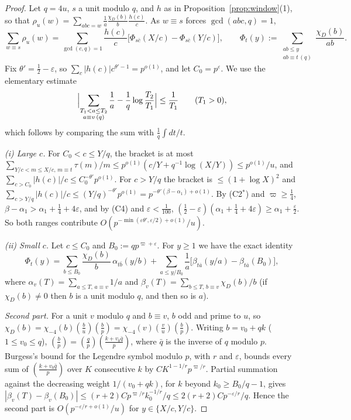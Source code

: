 \documentclass[11pt,reqno]{amsart}
\theoremstyle{definition}
\newcommand{\eps}{\varepsilon}
\newcommand{\leg}[2]{\left(\frac{#1}{#2}\right)}
\begin{document}
\begin{proof}
Let $q=4u$, $s$ a unit modulo $q$, and $h$ as in
Proposition~\ref{prop:window}(1), so that $\rho_u(w)=\sum_{abc=w}\frac1a
\frac{\chi_D(b)}b\frac{h(c)}c$.  As $w\equiv s$ forces $\gcd(abc,q)=1$,
\[
 \sum_{w\equiv s}\rho_u(w)=\sum_{\gcd(c,q)=1}\frac{h(c)}c\bigl[\Phi_{s\bar
 c}(X/c)-\Phi_{s\bar c}(Y/c)\bigr],\qquad
 \Phi_t(y):=\sum_{\substack{ab\le y\\ ab\equiv t\,(q)}}\frac{\chi_D(b)}{ab}.
\]
Fix $\theta'=\frac12-\eps$, so $\sum_c|h(c)|c^{\theta'-1}=p^{o(1)}$, and let
$C_0=p^\eps$.  We use the elementary estimate
\begin{equation}\label{eq:APharm}
 \Bigl|\sum_{\substack{T_1<a\le T_2\\ a\equiv v\,(q)}}\frac1a-\frac1q\log\frac{T_2}{T_1}\Bigr|\le\frac1{T_1}\qquad(T_1>0),
\end{equation}
which follows by comparing the sum with $\frac1q\int dt/t$.

\emph{(i) Large $c$.}  For $C_0<c\le Y/q$, the bracket is at most
$\sum_{Y/c<m\le X/c,\,m\equiv t}\tau(m)/m\le p^{o(1)}(c/Y+q^{-1}\log(X/Y))
\le p^{o(1)}/u$, and $\sum_{c>C_0}|h(c)|/c\le C_0^{-\theta'}p^{o(1)}$.
For $c>Y/q$ the bracket is $\le(1+\log X)^2$ and $\sum_{c>Y/q}|h(c)|/c\le
(Y/q)^{-\theta'}p^{o(1)}=p^{-\theta'(\beta-\alpha_1)+o(1)}$.  By (C2$^*$)
and $\varpi\ge\frac14$, $\beta-\alpha_1>\alpha_1+\frac14+4\eps$, and by (C4)
and $\eps<\frac1{100}$, $(\frac12-\eps)(\alpha_1+\frac14+4\eps)\ge\alpha_1+\frac\eps2$.
So both ranges contribute $O(p^{-\min(\eps\theta',\eps/2)+o(1)}/u)$.

\emph{(ii) Small $c$.}  Let $c\le C_0$ and $B_0:=qp^{\varpi+\eps}$.  For
$y\ge1$ we have the exact identity
\[
 \Phi_t(y)=\sum_{b\le B_0}\frac{\chi_D(b)}b\,\alpha_{t\bar b}(y/b)
 +\sum_{a\le y/B_0}\frac1a\bigl[\beta_{t\bar a}(y/a)-\beta_{t\bar a}(B_0)\bigr],
\]
where $\alpha_v(T)=\sum_{a\le T,\,a\equiv v}1/a$ and
$\beta_v(T)=\sum_{b\le T,\,b\equiv v}\chi_D(b)/b$ (if $\chi_D(b)\ne0$ then
$b$ is a unit modulo $q$, and then so is $a$).

\emph{Second part.}  For a unit $v$ modulo $q$ and $b\equiv v$, $b$ odd and
prime to $u$, so $\chi_D(b)=\chi_{-4}(b)\leg bu\leg bp=\chi_{-4}(v)\leg
vu\leg bp$.  Writing $b=v_0+qk$ ($1\le v_0\le q$), $\leg bp=\leg
qp\leg{k+v_0\bar q}p$, where $\bar q$ is the inverse of $q$ modulo $p$.
Burgess's bound for the Legendre symbol modulo $p$, with $r$ and $\eps$,
bounds every sum of $\leg{k+v_0\bar q}{p}$ over $K$ consecutive $k$ by
$CK^{1-1/r}p^{\varpi/r}$.  Partial summation against the decreasing weight
$1/(v_0+qk)$, for $k$ beyond $k_0\ge B_0/q-1$, gives
$|\beta_v(T)-\beta_v(B_0)|\le(r+2)Cp^{\varpi/r}k_0^{-1/r}/q\le2(r+2)Cp^{-\eps/r}/q$.
Hence the second part is $O(p^{-\eps/r+o(1)}/u)$ for $y\in\{X/c,Y/c\}$.


\end{proof}
\end{document}
